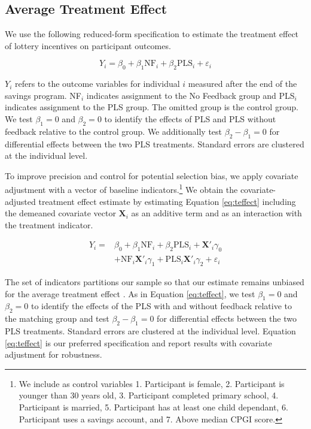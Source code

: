 \documentclass[11pt]{article}
\begin{document}
	\subsection{Average Treatment Effect}

		We use the following reduced-form specification to estimate the treatment effect of lottery incentives on participant outcomes.

		\begin{equation} \label{eq:teffect}
			Y_{i} = \beta_{0} + \beta_{1}\text{NF}_{i} + \beta_{2}\text{PLS}_{i} + \varepsilon_{i}
		\end{equation}

		$Y_{i}$ refers to the outcome variables for individual $i$ measured after the end of the savings program. NF$_i$ indicates assignment to the No Feedback group and PLS$_i$ indicates assignment to the PLS group. The omitted group is the control group. We test $\beta_{1} = 0$ and $\beta_{2} = 0$ to identify the effects of PLS and PLS without feedback relative to the control group. We additionally test $\beta_{2} - \beta_{1} = 0$ for differential effects between the two PLS treatments. Standard errors are clustered at the individual level.

		To improve precision and control for potential selection bias, we apply covariate adjustment with a vector of baseline indicators.\footnote{We include as control variables 1. Participant is female, 2. Participant is younger than 30 years old, 3. Participant completed primary school, 4. Participant is married, 5. Participant has at least one child dependant, 6. Participant uses a savings account, and 7. Above median CPGI score.} We obtain the covariate-adjusted treatment effect estimate by estimating Equation \ref{eq:teffect} including the demeaned covariate vector $\mathbf{X}_{i}$ as an additive term and as an interaction with the treatment indicator.

		\begin{equation} \begin{split} \label{eq:controls}
			Y_{i} = & \beta_{0} + \beta_{1}\text{NF}_{i} + \beta_{2}\text{PLS}_{i} + \mathbf{X}'_i \gamma_{0} \\
					& + \text{NF}_{i} \mathbf{X}'_i \gamma_{1} + \text{PLS}_{i} \mathbf{X}'_i \gamma_{2} + \varepsilon_{i}
		\end{split} \end{equation}

		The set of indicators partitions our sample so that our estimate remains unbiased for the average treatment effect \parencite{lin_agnostic_2013}. As in Equation \ref{eq:teffect}, we test $\beta_{1} = 0$ and $\beta_{2} = 0$ to identify the effects of the PLS with and without feedback relative to the matching group and test $\beta_{2} - \beta_{1} = 0$ for differential effects between the two PLS treatments. Standard errors are clustered at the individual level. Equation \ref{eq:teffect} is our preferred specification and report results with covariate adjustment for robustness.
\end{document}
